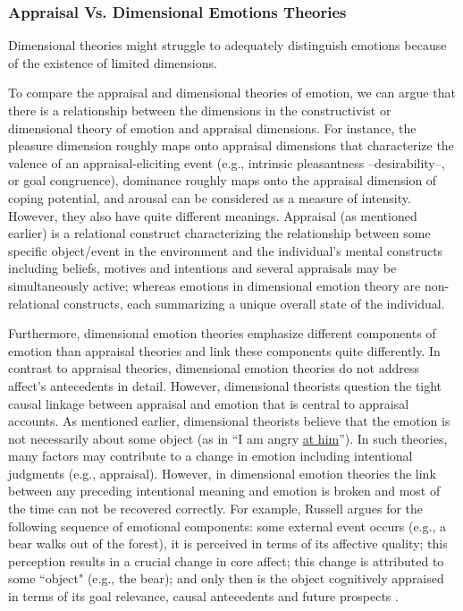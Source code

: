 \documentclass[12pt]{report}
\begin{document}
\subsubsection{Appraisal Vs. Dimensional Emotions Theories}

Dimensional theories might struggle to adequately distinguish emotions because
of the existence of limited dimensions.

To compare the appraisal and dimensional theories of emotion, we can argue that
there is a relationship between the dimensions in the constructivist or
dimensional theory of emotion and appraisal dimensions. For instance, the
pleasure dimension roughly maps onto appraisal dimensions that characterize the
valence of an appraisal-eliciting event (e.g., intrinsic pleasantness
--desirability--, or goal congruence), dominance roughly maps onto the appraisal
dimension of coping potential, and arousal can be considered as a measure of
intensity. However, they also have quite different meanings. Appraisal (as
mentioned earlier) is a relational construct characterizing the relationship
between some specific object/event in the environment and the individual's
mental constructs including beliefs, motives and intentions and several
appraisals may be simultaneously active; whereas emotions in dimensional emotion
theory are non-relational constructs, each summarizing a unique overall state of
the individual.

Furthermore, dimensional emotion theories emphasize different components of
emotion than appraisal theories and link these components quite differently.
In contrast to appraisal theories, dimensional emotion theories do not address
affect’s antecedents in detail. However, dimensional theorists question the
tight causal linkage between appraisal and emotion that is central to appraisal
accounts. As mentioned earlier, dimensional theorists believe that the emotion
is not necessarily about some object (as in ``I am angry \underline{at him}'').
In such theories, many factors may contribute to a change in emotion including
intentional judgments (e.g., appraisal). However, in dimensional emotion
theories the link between any preceding intentional meaning and emotion is
broken and most of the time can not be recovered correctly. For example, Russell
argues for the following sequence of emotional components: some external event
occurs (e.g., a bear walks out of the forest), it is perceived in terms of its
affective quality; this perception results in a crucial change in core affect;
this change is attributed to some ``object" (e.g., the bear); and only then is
the object cognitively appraised in terms of its goal relevance, causal
antecedents and future prospects \cite{marsella:computational-models}.
\end{document}
